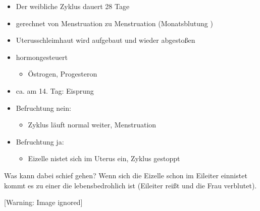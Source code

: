 \begin{itemize}
    \item Der weibliche Zyklus dauert 28 Tage
    \item gerechnet von Menstruation zu Menstruation  (Monatsblutung )
    \item Uterusschleimhaut wird aufgebaut und wieder abgesto{\ss}en
    \item hormongesteuert
    \begin{itemize}
        \item \"Ostrogen, Progesteron
    \end{itemize}
    \item ca. am 14. Tag: Eisprung
    \item Befruchtung nein:
    \begin{itemize}
        \item Zyklus l\"auft normal weiter, Menstruation
    \end{itemize}
    \item Befruchtung ja:
    \begin{itemize}
        \item Eizelle nistet sich im Uterus ein, Zyklus gestoppt
    \end{itemize}
\end{itemize}

Was kann dabei schief gehen? Wenn sich die Eizelle schon im Ei\-leiter
einnistet kommt es zu einer
die lebens\-bedrohlich ist (Eileiter rei{\ss}t und die Frau verblutet).

 [Warning: Image ignored] %

